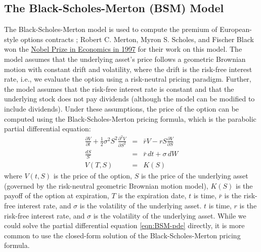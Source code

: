\documentclass[11pt]{article}
\theoremstyle{definition}
\begin{document}
\subsection*{The Black-Scholes-Merton (BSM) Model}
The Black-Scholes-Merton model is used to compute the premium of European-style options contracts \cite{BlackScholes1973};
Robert C. Merton, Myron S. Scholes, and Fischer Black won the \href{https://www.nobelprize.org/prizes/economic-sciences/1997/press-release/}{Nobel Prize in Economics in 1997} for their work on this model.
The model assumes that the underlying asset's price follows a geometric Brownian motion with constant drift and volatility, where the drift is the risk-free interest rate, i.e., we evaluate the option using a risk-neutral pricing paradigm.
Further, the model assumes that the risk-free interest rate is constant and that the underlying stock does not pay dividends (although the model can be modified to include dividends).
Under these assumptions, the price of the option can be computed using the Black-Scholes-Merton pricing formula, which is the parabolic partial differential equation:
\begin{eqnarray}\label{eqn:BSM-pde}
	\frac{\partial{V}}{\partial{t}} + \frac{1}{2}\sigma^{2}S^{2}\frac{\partial^{2}V}{\partial{S}^{2}} & = & \bar{r}V - rS\frac{\partial{V}}{\partial{S}}  \\
	\frac{dS}{S} & = & \bar{r}\,dt + \sigma\,{dW}\\
	V(T,S) & = & K(S)
\end{eqnarray}
where $V(t, S)$ is the price of the option, $S$ is the price of the underlying asset (governed by the risk-neutral geometric Brownian motion model), 
$K(S)$ is the payoff of the option at expiration, $T$ is the expiration date, $t$ is time, 
$\bar{r}$ is the risk-free interest rate, and $\sigma$ is the volatility of the underlying asset.
$t$ is time, $r$ is the risk-free interest rate, and $\sigma$ is the volatility of the underlying asset.
While we could solve the partial differential equation \ref{eqn:BSM-pde} directly, it is more common to use the closed-form solution of the Black-Scholes-Merton pricing formula.
\end{document}
